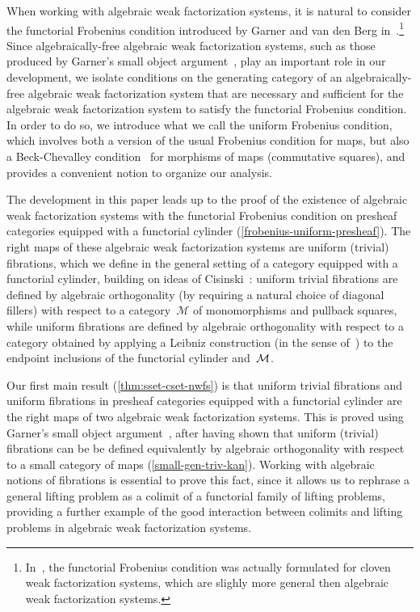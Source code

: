 \documentclass[reqno,10pt,a4paper,oneside,draft]{amsart}
\begin{document}
When working with algebraic weak factorization systems, it is natural to consider the functorial Frobenius condition introduced by Garner and van den Berg in~\cite{garner:topological-simplicial}.\footnote{In~\cite{garner:topological-simplicial}, the functorial Frobenius condition was actually formulated for cloven weak factorization systems, which are slighly more general then algebraic weak factorization systems.} Since algebraically-free algebraic weak factorization systems, such as those produced by Garner's small object argument~\cite{garner:small-object-argument}, play an important role in our development, we isolate conditions on the generating category of an algebraically-free algebraic weak factorization system that are necessary and sufficient for the algebraic weak factorization system to satisfy the functorial Frobenius condition.
In order to do so, we introduce what we call the uniform Frobenius condition, which involves both a version of the usual Frobenius condition for maps, but also a Beck-Chevalley condition~\cite{benabou-descente,lawvere-equality} for morphisms of maps (\ie commutative squares), and provides a convenient notion to organize our analysis.

The development in this paper leads up to the proof of the existence of algebraic weak factorization systems with the functorial Frobenius condition on presheaf categories equipped with a functorial cylinder (\cref{frobenius-uniform-presheaf}).
The right maps of these algebraic weak factorization systems are uniform (trivial) fibrations, which we define in the general setting of a category equipped with a functorial cylinder, building on ideas of Cisinski~\cite{cisinski-asterisque}: uniform trivial fibrations are defined by algebraic orthogonality (\ie by requiring a natural choice of diagonal fillers) with respect to a category~$\mathcal{M}$ of monomorphisms and pullback squares, while uniform fibrations are defined by algebraic orthogonality with respect to a category obtained by applying a Leibniz construction (in the sense of~\cite{riehl-verity:reedy}) to the endpoint inclusions of the functorial cylinder and~$\cal{M}$.

Our first main result (\cref{thm:sset-cset-nwfs}) is that uniform trivial fibrations and uniform fibrations in presheaf categories equipped with a functorial cylinder are the right maps of two algebraic weak factorization systems.
This is proved using Garner's small object argument~\cite{garner:small-object-argument}, after having shown that uniform (trivial) fibrations can be be defined equivalently by algebraic orthogonality with respect to a small category of maps (\cref{small-gen-triv-kan}).
Working with algebraic notions of fibrations is essential to prove this fact, since it allows us to rephrase a general lifting problem as a colimit of a functorial family of lifting problems, providing a further example of the good interaction between colimits and lifting problems in algebraic weak factorization systems.
\end{document}
